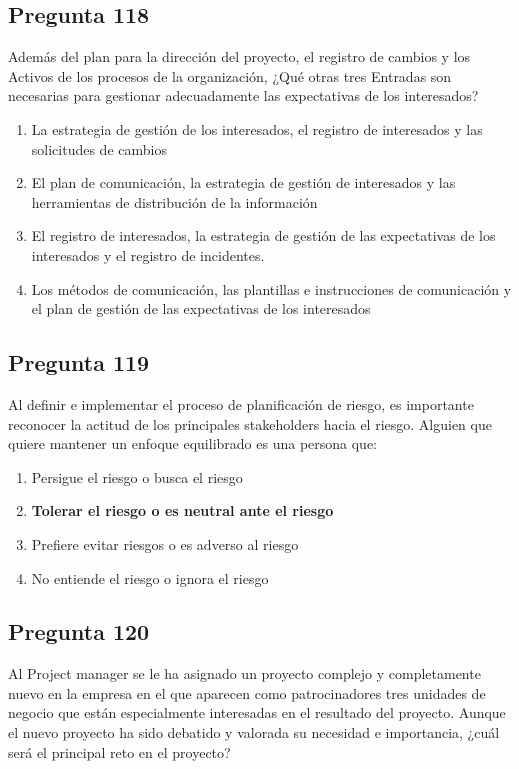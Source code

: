 \documentclass[11pt,a4paper]{article}
\begin{document}
\subsection*{Pregunta 118}
Además del plan para la dirección del proyecto, el registro de cambios y los Activos de los procesos de la organización, ¿Qué otras tres Entradas son necesarias para gestionar adecuadamente las expectativas de los interesados?

\begin{enumerate}[label=\alph*)]
  \item La estrategia de gestión de los interesados, el registro de interesados y las solicitudes de cambios
  \item El plan de comunicación, la estrategia de gestión de interesados y las herramientas de distribución de la información
  \item El registro de interesados, la estrategia de gestión de las expectativas de los interesados y el registro de incidentes.
  \item Los métodos de comunicación, las plantillas e instrucciones de comunicación y el plan de gestión de las expectativas de los interesados
\end{enumerate}

\subsection*{Pregunta 119}
Al definir e implementar el proceso de planificación de riesgo, es importante reconocer la actitud de los principales stakeholders hacia el riesgo. Alguien que quiere mantener un enfoque equilibrado es una persona que:

\begin{enumerate}[label=\alph*)]
  \item Persigue el riesgo o busca el riesgo
  \item \textbf{Tolerar el riesgo o es neutral ante el riesgo}
  \item Prefiere evitar riesgos o es adverso al riesgo
  \item No entiende el riesgo o ignora el riesgo
\end{enumerate}

\subsection*{Pregunta 120}
Al Project manager se le ha asignado un proyecto complejo y completamente nuevo en la empresa en el que aparecen como patrocinadores tres unidades de negocio que están especialmente interesadas en el resultado del proyecto. Aunque el nuevo proyecto ha sido debatido y valorada su necesidad e importancia, ¿cuál será el principal reto en el proyecto?
\end{document}
